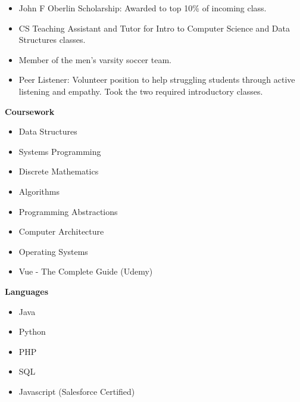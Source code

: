 \begin{itemize}
    \item John F Oberlin Scholarship: Awarded to top 10\% of incoming class.
    \item CS Teaching Assistant and Tutor for Intro to Computer Science and Data Structures classes.
    \item Member of the men's varsity soccer team.
    \item Peer Listener: Volunteer position to help struggling students through active listening and empathy. Took the two required introductory classes.
\end{itemize}
\textbf{Coursework}
\vspace*{-10px}
\begin{multicols*}{2}
\begin{itemize}
    \item Data Structures
    \item Systems Programming
    \item Discrete Mathematics
    \item Algorithms 
    \vfill\null
    \item Programming Abstractions
    \item Computer Architecture
    \item Operating Systems
    \item Vue - The Complete Guide (Udemy)
    
\end{itemize}
\end{multicols*}
\textbf{Languages}
\vspace*{-10px}
\begin{multicols}{2}
\begin{itemize}
    \item Java
    \item Python
    \item PHP
    \item SQL
    \item Javascript (Salesforce Certified)
\end{itemize}
\end{multicols}

